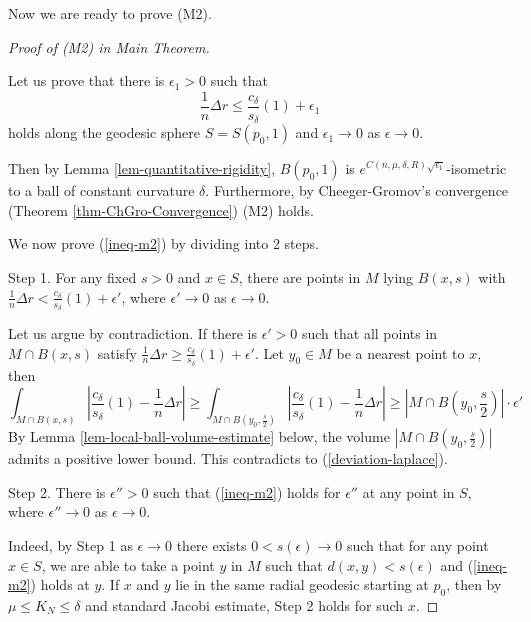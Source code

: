\documentclass{amsart}
\numberwithin{equation}{section}
\theoremstyle{remark}
\renewcommand{\(}{\left(}
\renewcommand{\)}{\right)}
\renewcommand{\~}{\tilde}
\renewcommand{\-}{\overline}
\renewcommand{\d}{\delta}
\newcommand{\e}{\epsilon}
\newcommand{\ra}{\rightarrow}
\begin{document}
Now we are ready to prove (M2).
\vspace{2mm}
\begin{proof}[Proof of (M2) in Main Theorem]
	~
	
	Let us prove that there is $\epsilon_1>0$ such that
	\begin{equation}\label{ineq-m2}
	\frac{1}{n}\Delta r\le \frac{c_\d}{s_\d}(1)+\epsilon_1
	\end{equation}
	holds along the geodesic sphere $S=S(p_0,1)$ and $\epsilon_1\to 0$ as $\epsilon\to 0$.
	
	Then by Lemma \ref{lem-quantitative-rigidity}, $B(p_0,1)$ is $e^{C(n,\mu,\d,R)\sqrt{\epsilon_1}}$-isometric to a ball of constant curvature $\d$. Furthermore, by Cheeger-Gromov's convergence (Theorem \ref{thm-ChGro-Convergence}) (M2) holds.
	
	We now prove (\ref{ineq-m2}) by dividing into 2 steps.
	
	Step 1. For any fixed $s>0$ and $x\in S$, there are points in $M$ lying $B(x,s)$ with $\frac{1}{n}\Delta r<\frac{c_\d}{s_\d}(1)+\e'$, where $\e'\to 0$ as $\e\ra 0$.
	
	Let us argue by contradiction. If there is $\e'>0$ such that all points in $M\cap B(x,s)$ satisfy $\frac{1}{n}\Delta r\ge \frac{c_\d}{s_\d}(1)+ \e'$. Let $y_0\in M$ be a nearest point to $x$, then
	$$\int_{M \cap B(x,s)}\left| \frac{c_\d}{s_\d}(1)-\frac{1}{n}\Delta r\right|\ge
	\int_{M \cap B(y_0,\frac{s}{2})}\left| \frac{c_\d}{s_\d}(1)-\frac{1}{n}\Delta r\right|
	\ge |M \cap B(y_0,\frac{s}{2})|\cdot \e'$$
	By Lemma \ref{lem-local-ball-volume-estimate} below, the volume $|M \cap B(y_0,\frac{s}{2})|$ admits a positive lower bound. This contradicts to (\ref{deviation-laplace}).
	
	Step 2. There is $\e''>0$ such that (\ref{ineq-m2}) holds for $\e''$ at any point in $S$, where $\e''\to 0$ as $\e\to 0$.
	
	Indeed, by Step 1 as $\e\to 0$ there exists $0<s(\e)\to 0$ such that for any point $x\in S$, we are able to take a point $y$ in $M$ such that $d(x,y)<s(\e)$ and (\ref{ineq-m2}) holds at $y$.
	If $x$ and $y$ lie in the same radial geodesic starting at $p_0$, then by $\mu \le K_N\le \d$ and standard Jacobi estimate, Step 2 holds for such $x$.
	

\end{proof}
\end{document}
